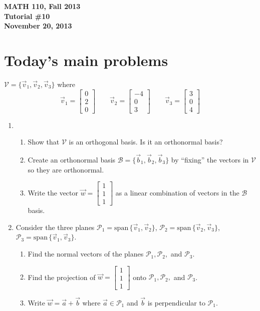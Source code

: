 \documentclass[11pt]{exam}
\newcommand{\mat}[1]{\begin{bmatrix}#1\end{bmatrix}}
\renewcommand{\span}{\mathrm{span}\,}
\newcommand{\mthCourse}{MATH 110}
\newcommand{\mthTerm}{Fall 2013}
\newcommand{\mthTutorialNumber}{10}
\newcommand{\mthDate}{November 20, 2013}
\begin{document}
{\large
	\begin{center}
		{\bf \mthCourse, \mthTerm}\\ 
		{\bf Tutorial \#\mthTutorialNumber}\\
		{\bf \mthDate}
	\end{center}
}

\section*{Today's main problems}
		$\mathcal V=\{\vec v_1,\vec v_2,\vec v_3\}$ where
		\[
			\vec v_1=\mat{0\\2\\0}\qquad
			\vec v_2=\mat{-4\\0\\3}\qquad
			\vec v_3=\mat{3\\0\\4}
		\]
\begin{enumerate}
	\item 
	\begin{enumerate}
		\item Show that $\mathcal V$ is an orthogonal basis.  Is it an
		orthonormal basis?

		\item Create an orthonormal basis $\mathcal B=\{\vec b_1,\vec b_2,\vec b_3\}$ 
		by ``fixing'' the vectors in $\mathcal V$ so they are orthonormal.

		\item Write the vector $\vec w=\mat{1\\1\\1}$ as a linear combination of
			vectors in the $\mathcal B$ basis.
	\end{enumerate}

\item Consider the three planes $\mathcal P_1=\span \{\vec v_1,\vec v_2\}$, 
	$\mathcal P_2=\span \{\vec v_2,\vec v_3\}$, $\mathcal P_3=\span \{\vec v_1,\vec v_3\}$.
	\begin{enumerate}
		\item Find the normal vectors of the planes $\mathcal P_1,
			\mathcal P_2,$ and $\mathcal P_3$.
		\item Find the projection of $\vec w=\mat{1\\1\\1}$ onto $\mathcal P_1,
			\mathcal P_2,$ and $\mathcal P_3$.
		\item Write $\vec w=\vec a+\vec b$ where $\vec a\in \mathcal P_1$ and
			$\vec b$ is perpendicular to $\mathcal P_1$.
	\end{enumerate}
	

\end{enumerate}
\end{document}
